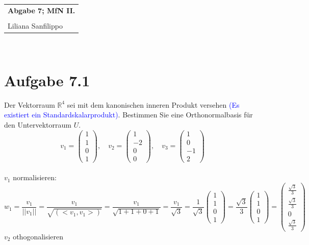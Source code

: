 \documentclass{article} %
\newcommand{\titulo}{Abgabe 7; MfN II.}
\newcommand{\nombre}{Liliana Sanfilippo}
\newcommand{\txc}[1]{\textcolor{blue}{#1}}
\begin{document}
\begin{tabular}{p{12cm}}
{{\Large\bf\titulo}}\\
\vspace{0.2cm}\\
 {\large\nombre}\\
\end{tabular} 
\vspace{0.2cm}\\
\section{Aufgabe 7.1}
Der Vektorraum $\mathbb{R}^4$ sei mit dem kanonischen inneren Produkt versehen \txc{(Es existiert ein Standardskalarprodukt)}. Bestimmen Sie eine Orthonormalbasis für den Untervektorraum $U$. 
\[
v_1 = \begin{pmatrix} 
1\\1\\0\\1
\end{pmatrix}, \quad v_2 = \begin{pmatrix} 
1\\-2\\0\\0
\end{pmatrix}, \quad v_3 = \begin{pmatrix} 
1\\0\\-1\\2
\end{pmatrix}
\]
\\ 
$v_1$ normalisieren: 
\[
w_1 = \frac{v_1}{||v_1||} = \frac{v_1}{\sqrt{(<v_1, v_1>)}}  = \frac{v_1}{\sqrt{1 + 1+ 0 + 1}} = \frac{v_1}{\sqrt{3}}   = \frac{1}{\sqrt{3}} \begin{pmatrix} 
1\\1\\0\\1
\end{pmatrix} =  \frac{\sqrt{3}}{3} \begin{pmatrix} 
1\\1\\0\\1
\end{pmatrix} = \begin{pmatrix} 
\frac{\sqrt{3}}{3}\\\frac{\sqrt{3}}{3}\\0\\\frac{\sqrt{3}}{3}
\end{pmatrix} 
\]
$v_2$ othogonalisieren 
\end{document}
